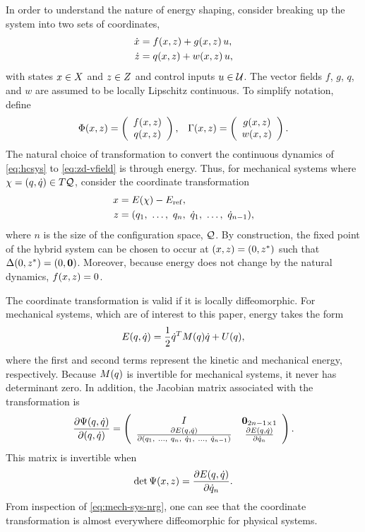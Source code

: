In order to understand the nature of energy shaping, consider breaking up the system into two sets of coordinates,
%
\begin{align}
  \nonumber
  \dot {x} &= f(x, z) + g(x, z) \, u,\\
  \dot {z} &= q(x, z) + w(x, z) \, u,
  \label{eq:zd-vfield}
\end{align}
%
with states $x \in X$ and $z \in Z$ and control inputs $u \in \mathcal{U}$.
%
The vector fields $f$, $g$, $q$, and $w$ are assumed to be locally Lipschitz continuous.
%
To simplify notation, define
%
\begin{align}
  \Phi(x, z) = \left(\begin{array}{c}
    f(x, z)\\
    q(x, z)
  \end{array}\right),&&
  \Gamma (x, z) = \left(\begin{array}{c}
    g(x, z)\\
    w(x, z)
  \end{array}\right).
\end{align}
%
The natural choice of transformation to convert the continuous dynamics of \eqref{eq:hcsys} to \eqref{eq:zd-vfield} is through energy.
%
Thus, for mechanical systems where $\chi = (q, \dot{q}) \in T\mathcal{Q}$, consider the coordinate transformation
%
\begin{align}
  \nonumber
  x &= E(\chi) - E_{\mathrm{ref}},\\
  z &= (q_{1}, \ \ldots, \ q_{n}, \ \dot{q}_{1}, \ \ldots, \ \dot{q}_{n-1}),
\end{align}
where $n$ is the size of the configuration space, $\mathcal{Q}$.
%
By construction, the fixed point of the hybrid system can be chosen to occur at $(x, z) = (0, z^{*})$ such that $\Delta(0, z^{*}) = (0, {\mathbf 0})$.
%
Moreover, because energy does not change by the natural dynamics, $f(x, z) = 0$.
%

%
The coordinate transformation is valid if it is locally diffeomorphic.
%
For mechanical systems, which are of interest to this paper, energy takes the form
%
\begin{align}
  \label{eq:mech-sys-nrg}
  E(q, \dot{q}) = \frac{1}{2} \dot{q}^{T} M(q) \dot{q} + U(q),
\end{align}
%
where the first and second terms represent the kinetic and mechanical energy, respectively.
%
Because $M(q)$ is invertible for mechanical systems, it never has determinant zero.
%
In addition, the Jacobian matrix associated with the transformation is
\begin{align}
  \frac{\partial{\Psi(q, \dot{q})}}{\partial{(q, \dot{q})}} =
  \left(\begin{array}{c c}
    I & {\mathbf 0}_{2n-1 \times 1}\\
    \frac{\partial{E(q, \dot{q})}}{\partial{(q_{1}, \ \ldots, \ q_{n}, \ \dot{q}_{1}, \ \ldots, \ \dot{q}_{n-1})}} & \frac{\partial{E(q, \dot{q})}}{\partial{\dot{q}_{n}}}
  \end{array}\right).
\end{align}
%
This matrix is invertible when
\begin{align*}
  \det \Psi(x, z) = \frac{\partial{E(q, \dot{q})}}{\partial{\dot{q}_{n}}}.
\end{align*}
From inspection of \eqref{eq:mech-sys-nrg}, one can see that the coordinate transformation is almost everywhere diffeomorphic for physical systems.

